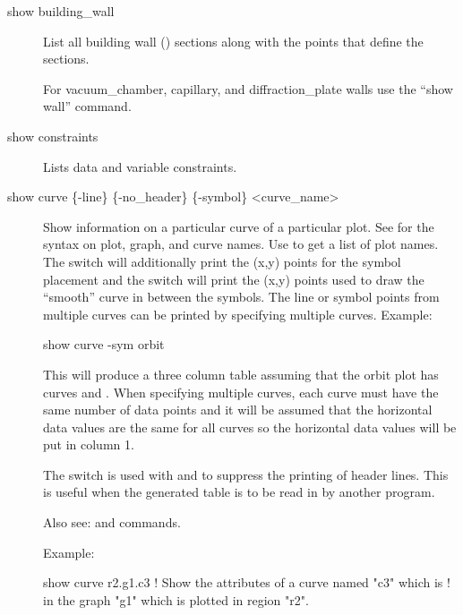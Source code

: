 {{{\begin{description}
\item[show building_wall] \Newline

\vskip -0.2in 

List all building wall () sections
along with the points that define the sections. 

For vacuum_chamber, capillary, and diffraction_plate walls use the
``show wall'' command.


\item[show constraints] \Newline

\vskip -0.2in

Lists data and variable constraints.


\item[show curve \{-line\} \{-no_header\} \{-symbol\} <curve\_name>] \Newline

\vskip -0.2in

Show information on a particular curve of a particular plot. See
 for the syntax on plot, graph, and curve names.  Use
 to get a list of plot names. The  switch
will additionally print the (x,y) points for the symbol placement and
the  switch will print the (x,y) points used to draw the
``smooth'' curve in between the symbols. The line or symbol points
from multiple curves can be printed by specifying multiple curves. Example:
\begin{example}
  show curve -sym orbit
\end{example}
This will produce a three column table assuming that the orbit plot
has curves  and . When specifying
multiple curves, each curve must have the same number of data points
and it will be assumed that the horizontal data values are the same
for all curves so the horizontal data values will be put in column 1.

The  switch is used with  and  to
suppress the printing of header lines. This is useful when the generated
table is to be read in by another program.

Also see:  and  commands.

Example:
\begin{example}
  show curve r2.g1.c3     ! Show the attributes of a curve named "c3" which is 
                          !   in the graph "g1" which is plotted in region "r2".
\end{example}


\end{description}}}}
